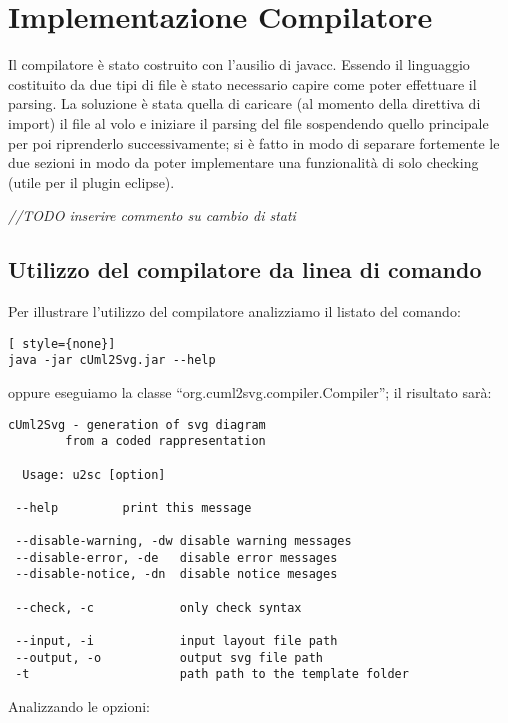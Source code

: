 \section{Implementazione Compilatore}

Il compilatore è stato costruito con l'ausilio di javacc. Essendo il linguaggio
costituito da due tipi di file è stato necessario capire come poter effettuare
il parsing. La soluzione è stata quella di caricare (al momento della direttiva
di import) il file al volo e iniziare il parsing del file sospendendo
quello principale per poi riprenderlo successivamente; si è fatto in modo di
separare fortemente le due sezioni in modo da poter implementare una
funzionalità di solo checking (utile per il plugin eclipse).

\emph{//TODO inserire commento su cambio di stati}

\subsection{Utilizzo del compilatore da linea di comando}

Per illustrare l'utilizzo del compilatore analizziamo il listato del comando:

\begin{lstlisting}[ style={none}]
java -jar cUml2Svg.jar --help
\end{lstlisting}

oppure eseguiamo la classe ``org.cuml2svg.compiler.Compiler''; il risultato sarà:

\begin{lstlisting}[caption={Output dell'help da linea di comando}, style={none}]
cUml2Svg - generation of svg diagram
        from a coded rappresentation

  Usage: u2sc [option]
 
 --help         print this message
 
 --disable-warning, -dw disable warning messages
 --disable-error, -de   disable error messages
 --disable-notice, -dn  disable notice mesages
 
 --check, -c            only check syntax
 
 --input, -i            input layout file path
 --output, -o           output svg file path
 -t                     path path to the template folder
\end{lstlisting}

Analizzando le opzioni:

